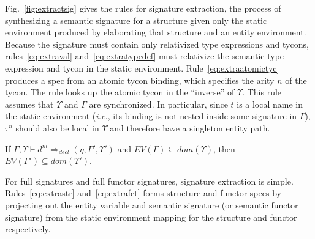 \documentclass[9pt,nocopyrightspace, fleqn]{sigplanconf}
\begin{document}
Fig.~\ref{fig:extractsig} gives the rules for signature extraction, the process of synthesizing a semantic signature for a structure given only the static environment produced by elaborating that structure and an entity environment. Because the signature must contain only relativized type expressions and tycons, rules~\ref{eq:extraval} and~\ref{eq:extratypedef} must relativize the semantic type expression and tycon in the static environment. Rule~\ref{eq:extraatomictyc} produces a spec from an atomic tycon binding, which specifies the arity $n$ of the tycon. The rule looks up the atomic tycon in the ``inverse'' of $\Upsilon$. This rule assumes that $\Upsilon$ and $\Gamma$ are synchronized. In particular, since $t$ is a local name in the static environment (\emph{i.e.}, its binding is not nested inside some signature in $\Gamma$), $\tau^n$ should also be local in $\Upsilon$ and therefore have a singleton entity path. 
 
\begin{lemma}
If $\Gamma,\Upsilon \vdash d^m \Rightarrow_{decl} (\eta, \Gamma', \Upsilon')$ and $EV(\Gamma)\subseteq dom(\Upsilon)$, then $EV(\Gamma')\subseteq dom(\Upsilon')$. 
\end{lemma}

For full signatures and full functor signatures, signature extraction is simple. Rules~\ref{eq:extrastr} and~\ref{eq:extrafct} forms structure and functor specs by projecting out the entity variable and semantic signature (or semantic functor signature) from the static environment mapping for the structure and functor respectively. 
\end{document}
